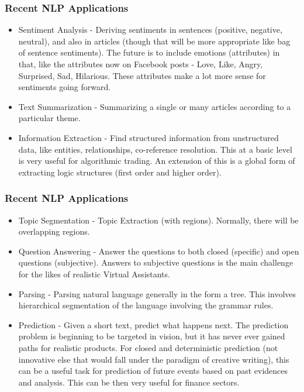 \begin{frame}[fragile]\frametitle{Recent NLP Applications}
  \begin{itemize}
  \item Sentiment Analysis - Deriving sentiments in sentences (positive, negative, neutral), and also in articles (though that will be more appropriate like bag of sentence sentiments). The future is to include emotions (attributes) in that, like the attributes now on Facebook posts - Love, Like, Angry, Surprised, Sad, Hilarious. These attributes make a lot more sense for sentiments going forward.
  \item Text Summarization - Summarizing a single or many articles according to a particular theme.
  \item Information Extraction - Find structured information from unstructured data, like entities, relationships, co-reference resolution. This at a basic level is very useful for algorithmic trading. An extension of this is a global form of extracting logic structures (first order and higher order).

  \end{itemize}
\end{frame}

\begin{frame}[fragile]\frametitle{Recent NLP Applications}
  \begin{itemize}
  \item Topic Segmentation - Topic Extraction (with regions). Normally, there will be overlapping regions.
  \item Question Answering - Answer the questions to both closed (specific) and open questions (subjective). Answers to subjective questions is the main challenge for the likes of realistic Virtual Assistants.
  \item Parsing - Parsing natural language generally in the form a tree. This involves hierarchical segmentation of the language involving the grammar rules.
  \item Prediction - Given a short text, predict what happens next. The prediction problem is beginning to be targeted in vision, but it has never ever gained paths for realistic products. For closed and deterministic prediction (not innovative else that would fall under the paradigm of creative writing), this can be a useful task for prediction of future events based on past evidences and analysis. This can be then very useful for finance sectors.

  \end{itemize}
\end{frame}

